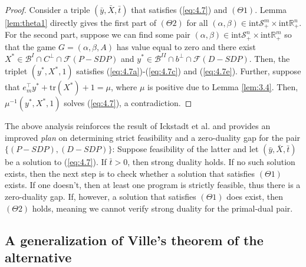 \documentclass[11pt, twoside]{article}
\numberwithin{equation}{section}
\theoremstyle{definition}
\begin{document}
\begin{proof}
    Consider a triple $(\bar{y},\bar{X},\bar{t})$ that satisfies (\ref{eq:4.7}) and \hyperlink{theta1}{$(\Theta1)$}. Lemma \ref{lem:theta1} directly gives the first part of \hyperlink{theta2}{$(\Theta2)$} for all $(\alpha,\beta)\in\text{int}\mathcal{S}^{m}_{+}\times \text{int}\mathbb{R}^{n}_{+}$. For the second part, suppose we can find some pair $(\alpha,\beta)\in \text{int}\mathcal{S}^{n}_{+}\times\text{int} \mathbb{R}^{m}_{+}$ so that the game $G=(\alpha,\beta,A)$ has value equal to zero and there exist $X^*\in\mathcal{B}^{I}\cap C^{\perp}\cap\mathcal{F}(P-SDP)$ and $y^*\in\mathcal{B}^{II}\cap b^{\perp}\cap\mathcal{F}(D-SDP)$. Then, the triplet $(y^*,X^*,1)$ satisfies (\ref{eq:4.7a})-(\ref{eq:4.7c}) and (\ref{eq:4.7e}). Further, suppose that $e_m^\top y^*+\text{tr}(X^*)+1=\mu$, where $\mu$ is positive due to Lemma \ref{lem:3.4}. Then, $\mu^{-1}(y^*,X^*,1)$ solves (\ref{eq:4.7}), a contradiction.
\end{proof}


The above analysis reinforces the result of Ickstadt et al. \cite{ickstadt2024semidefinite} and provides an improved \textit{plan} on determining strict feasibility and a zero-duality gap for the pair \hyperlink{primaldualsdp}{$\{(P-SDP),(D-SDP)\}$}: Suppose feasibility of the latter and let $(\bar{y},\bar{X},\bar{t})$ be a solution to (\ref{eq:4.7}). If $\bar{t}>0$, then strong duality holds. If no such solution exists, then the next step is to check whether a solution that satisfies \hyperlink{theta1}{$(\Theta1)$} exists. If one doesn't, then at least one program is strictly feasible, thus there is a zero-duality gap. If, however, a solution that satisfies \hyperlink{theta1}{$(\Theta1)$} does exist, then \hyperlink{theta2}{$(\Theta2)$} holds, meaning we cannot verify strong duality for the primal-dual pair.\vspace{0.2cm}\par






\vspace{-0.1cm} \subsection{A generalization of Ville's theorem of the alternative}\vspace{-0.2cm}
 
\end{document}
